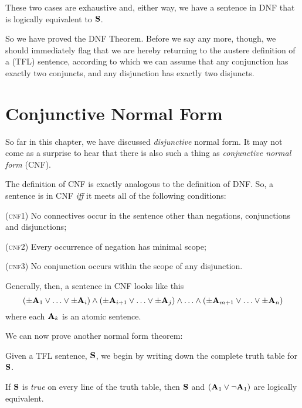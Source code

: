 	These two cases are exhaustive and, either way, we have a sentence in DNF that is logically equivalent to $\mathbf{S}$.

So we have proved the DNF Theorem. Before we say any more, though, we should immediately flag that we are hereby returning to the austere definition of a (TFL) sentence, according to which we can assume that any conjunction has exactly two conjuncts, and any disjunction has exactly two disjuncts.


\section{Conjunctive Normal Form}
\label{s:CNF}

So far in this chapter, we have discussed \emph{disjunctive} normal form. It may not come as a surprise to hear that there is also such a thing as \emph{conjunctive normal form} (CNF).

The definition of CNF is exactly analogous to the definition of DNF. So, a sentence is in CNF \emph{iff} it meets all of the following conditions:
	\begin{earg}
		\item[(\textsc{cnf1})] No connectives occur in the sentence other than negations, conjunctions and disjunctions;
		\item[(\textsc{cnf2})] Every occurrence of negation has minimal scope;
		\item[(\textsc{cnf3})] No conjunction occurs within the scope of any disjunction. 
	\end{earg}
Generally, then, a sentence in CNF looks like this
	$$(\pm \mathbf{A}_1 \lor \ldots \lor \pm \mathbf{A}_i) \land (\pm \mathbf{A}_{i+1} \lor \ldots \lor \pm\mathbf{A}_j) \land \ldots \land (\pm\mathbf{A}_{m+1} \lor\ldots \lor \pm \mathbf{A}_n)$$
where each $\mathbf{A}_k$ is an atomic sentence.

We can now prove another normal form theorem:

        
	Given a TFL sentence, $\mathbf{S}$, we begin by writing down the complete truth table for $\mathbf{S}$.
	
	If $\mathbf{S}$ is \emph{true} on every line of the truth table, then $\mathbf{S}$ and $(\mathbf{A}_1 \vee \neg \mathbf{A}_1)$ are logically equivalent.
	

